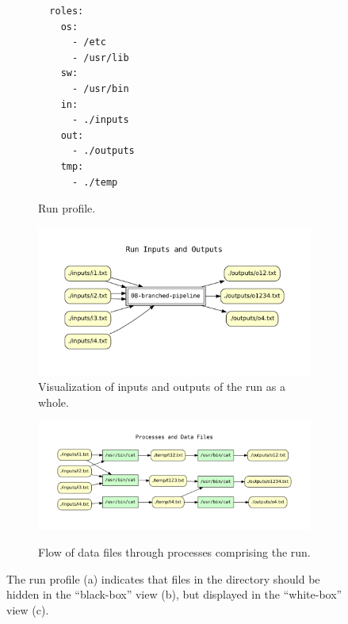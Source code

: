 \begin{figure}[th]
  \centering          
  \begin{subfigure}[c]{0.18\linewidth}
    \begin{verbatim}
  roles:
    os:
      - /etc
      - /usr/lib
    sw:
      - /usr/bin
    in:
      - ./inputs
    out:
      - ./outputs
    tmp:
      - ./temp
    \end{verbatim}
    \vspace*{-2em}
    \caption{Run profile.}
    \label{subfig-profile}
  \end{subfigure}
  \hfill
  \begin{subfigure}[c]{0.69\linewidth}
    \includegraphics[width=0.92\linewidth]{cpr_run_inputs_outputs.pdf}
    \caption{Visualization of inputs and outputs of the run as a whole.}
    \label{subfig-blackbox}
    \vspace*{-4.8em}
  \end{subfigure} 

   
  \vspace*{1em}
  \begin{subfigure}[b]{0.9\linewidth}
    {\includegraphics[width=1.0\linewidth]{cpr_processes_and_data_files.pdf}}
    \caption{Flow of data files through processes comprising the run.}
    \label{subfig-whitebox}
  \end{subfigure}
  \caption{The run profile (a) indicates that files in the  
          directory should be hidden in the ``black-box'' view (b), but displayed
          in the ``white-box'' view (c).}
  \label{fig-cpr-example}
  \vspace*{-1.5em}
\end{figure}





